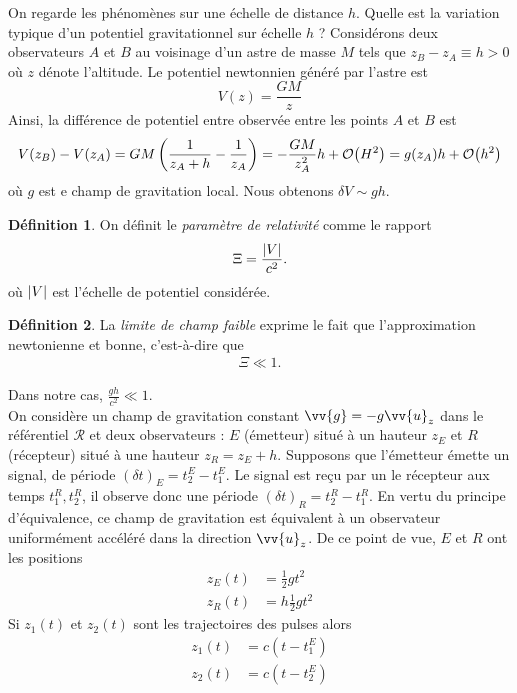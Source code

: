 \documentclass[a4paper,11pt]{report}
\theoremstyle{definition}
\theoremstyle{plain}
\theoremstyle{definition}
\newtheorem{defn}{Définition}[chapter]
\theoremstyle{remark}
\newcommand{\R}{\mathcal{R}}
\begin{document}
                On regarde les phénomènes sur une échelle de distance $h$. Quelle est la variation typique d'un potentiel gravitationnel sur échelle $h$ ? Considérons deux observateurs $A$ et $B$ au voisinage d'un astre de masse $M$ tels que $z_B-z_A\equiv h>0$ où $z$ dénote l'altitude. Le potentiel newtonnien généré par l'astre est
                \begin{equation}
                    V(z) = \frac{GM}{z}
                \end{equation}
                Ainsi, la différence de potentiel entre observée entre les points $A$ et $B$ est
                \begin{equation}
                    V(z_B)-V(z_A) = GM\left( \frac{1}{z_A+h} -\frac{1}{z_A}\right)=-\frac{GM}{z^2_A}h+\order{H^2} = g(z_A)h +\order{h^2}
                \end{equation}
                où $g$ est e champ de gravitation local. Nous obtenons $\delta V\sim gh$.
                \begin{defn}
                    On définit le \textit{paramètre de relativité} comme le rapport
                    \begin{equation}
                        \Xi = \frac{\abs{V}}{c^2}.
                    \end{equation}
                    où $\abs{V}$ est l'échelle de potentiel considérée.
                \end{defn}
                \begin{defn}
                La \textit{limite de champ faible} exprime le fait que l'approximation newtonienne et bonne, c'est-à-dire que
                \begin{align}
                    \Xi\ll1.
                \end{align}
                \end{defn}
                Dans notre cas, $\frac{gh}{c^2}\ll1$.\\
            
                On considère un champ de gravitation constant $\vv{g}=-g\vv{u}_z$ dans le référentiel $\R$ et deux observateurs : $E$ (émetteur) situé à un hauteur $z_E$ et $R$ (récepteur) situé à une hauteur $z_R = z_E+h$. Supposons que l'émetteur émette un signal, de période $(\delta t)_E = t_2^E-t_1^E$. Le signal est reçu par un le récepteur aux temps $t_1^R,t_2^R$, il observe donc une période $(\delta t)_R = t_2^R-t_1^R$. En vertu du principe d'équivalence, ce champ de gravitation est équivalent à un observateur uniformément accéléré dans la direction $\vv{u}_z$. De ce point de vue, $E$ et $R$ ont les positions
                \begin{align}
                    z_E(t) &=  \frac{1}{2}gt^2 \\
                    z_R(t) &= h  \frac{1}{2}gt^2
                \end{align}
                Si $z_1(t)$ et $z_2(t)$ sont les trajectoires des pulses alors
                \begin{align}
                    z_1(t) &= c(t-t^E_1) \\
                    z_2(t) &= c(t-t_2^E)
                \end{align}
                
\end{document}
